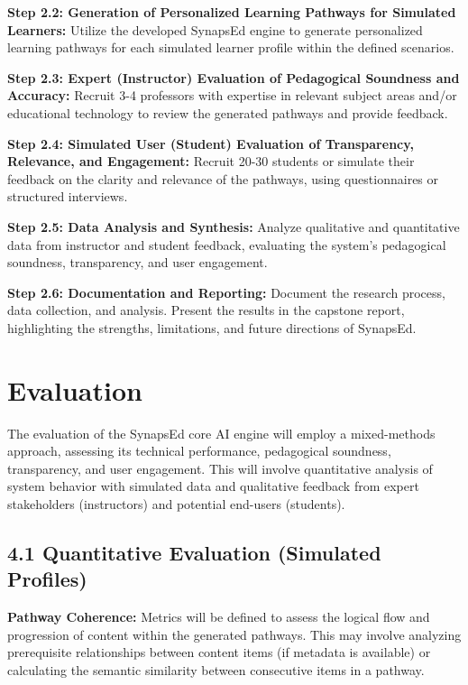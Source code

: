 \documentclass{stylefiles/capstone}
\begin{document}
\textbf{Step 2.2: Generation of Personalized Learning Pathways for Simulated Learners:}  
Utilize the developed SynapsEd engine to generate personalized learning pathways for each simulated learner profile within the defined scenarios.

\textbf{Step 2.3: Expert (Instructor) Evaluation of Pedagogical Soundness and Accuracy:}  
Recruit 3-4 professors with expertise in relevant subject areas and/or educational technology to review the generated pathways and provide feedback.

\textbf{Step 2.4: Simulated User (Student) Evaluation of Transparency, Relevance, and Engagement:}  
Recruit 20-30 students or simulate their feedback on the clarity and relevance of the pathways, using questionnaires or structured interviews.

\textbf{Step 2.5: Data Analysis and Synthesis:}  
Analyze qualitative and quantitative data from instructor and student feedback, evaluating the system’s pedagogical soundness, transparency, and user engagement.

\textbf{Step 2.6: Documentation and Reporting:}  
Document the research process, data collection, and analysis. Present the results in the capstone report, highlighting the strengths, limitations, and future directions of SynapsEd.

\section{Evaluation}

The evaluation of the SynapsEd core AI engine will employ a mixed-methods approach, assessing its technical performance, pedagogical soundness, transparency, and user engagement. This will involve quantitative analysis of system behavior with simulated data and qualitative feedback from expert stakeholders (instructors) and potential end-users (students).

\subsection{4.1 Quantitative Evaluation (Simulated Profiles)}

\textbf{Pathway Coherence:}  
Metrics will be defined to assess the logical flow and progression of content within the generated pathways. This may involve analyzing prerequisite relationships between content items (if metadata is available) or calculating the semantic similarity between consecutive items in a pathway.
\end{document}
